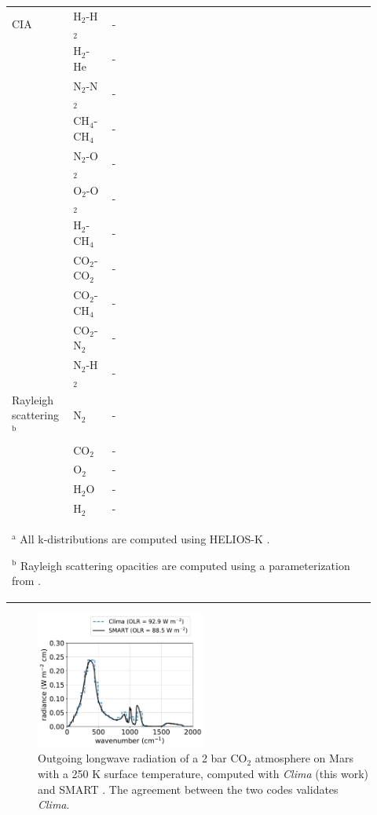 \begin{spacing}{1.0}
\begin{center}
\begin{tabularx}{\linewidth}{p{0.14\linewidth} | p{0.1\linewidth} | p{0.38\linewidth} | p{0.3\linewidth}}
    CIA & H$_2$-H$_2$ & - & \citet{Molliere_2019} \\
    & H$_2$-He & - & \citet{Molliere_2019} \\
    & N$_2$-N$_2$ & - & \citet{Molliere_2019} \\
    & CH$_4$-CH$_4$ & - & \citet{Karman_2019} \\
    & N$_2$-O$_2$ & - & \citet{Karman_2019} \\
    & O$_2$-O$_2$ & - & \citet{Karman_2019} \\
    & H$_2$-CH$_4$ & - & \citet{Karman_2019} \\
    & CO$_2$-CO$_2$ & - & \citet{Karman_2019} \\
    & CO$_2$-CH$_4$ & - & \citet{Karman_2019} \\
    & CO$_2$-N$_2$ & - & \citet{Karman_2019} \\
    & N$_2$-H$_2$ & - & \citet{Karman_2019} \\

    \hline

    Rayleigh scattering$^\text{b}$ & N$_2$ & - & \citet{Keady_2002,Penndorf_1957} \\
    & CO$_2$ & - & \citet{Keady_2002,Shemansky_1972} \\
    & O$_2$ & - & \citet{Keady_2002,Penndorf_1957} \\
    & H$_2$O & - & \citet{Keady_2002,Ranjan_2017,Murphy_1977} \\
    & H$_2$ & - & \citet{Keady_2002} \\

    \hline

  \multicolumn{4}{p{1.0\linewidth}}{
    $^\text{a}$ All k-distributions are computed using HELIOS-K \citep{Grimm_2021}.

    $^\text{b}$ Rayleigh scattering opacities are computed using a parameterization from \citet{Vardavas_1984}.
  }

  \end{tabularx}
\end{center}
\end{spacing}

\begin{figure}
  \centering
  \includegraphics[width=0.5\textwidth]{tex/5impacts/figures/supplement/early_mars_validation.pdf}
  \caption{Outgoing longwave radiation of a 2 bar CO$_2$ atmosphere on Mars with a 250 K surface temperature, computed with \emph{Clima} (this work) and SMART \citep{Meadows_1996}. The agreement between the two codes validates \emph{Clima}.}
  \label{fig:early_mars_validation}
\end{figure}